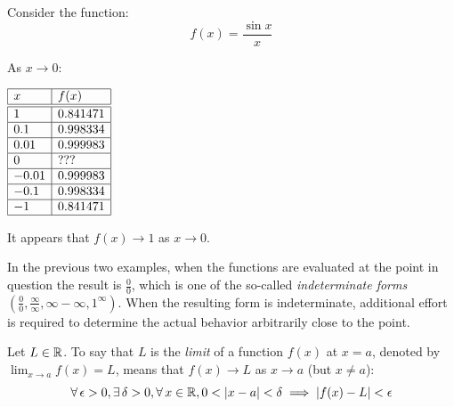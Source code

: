 \documentclass[letterpaper,12pt,fleqn]{article}
\newcommand{\e}{\epsilon}
\renewcommand{\d}{\delta}
\begin{document}
\begin{example}
  Consider the function:
  \[f(x)=\frac{\sin x}{x}\]

  \bigskip

  \begin{center}
  \end{center}

  As \(x\to0\):

  \begin{center}
    \(\begin{array}{|l|l|}
    \hline
    x & f(x) \\
    \hline
    \hline
    1 & 0.841471 \\
    \hline
    0.1 & 0.998334 \\
    \hline
    0.01 & 0.999983 \\
    \hline
    0 & ??? \\
    \hline
    -0.01 & 0.999983 \\
    \hline
    -0.1 & 0.998334 \\
    \hline
    -1 & 0.841471 \\
    \hline
    \end{array}\)
  \end{center}

  \bigskip

  It appears that \(f(x)\to1\) as \(x\to0\).
\end{example}

In the previous two examples, when the functions are evaluated at the point in question the result is
\(\frac{0}{0}\), which is one of the so-called \emph{indeterminate forms} \((\frac{0}{0},\frac{\infty}{\infty},
\infty-\infty,1^{\infty})\).  When the resulting form is indeterminate, additional effort is required to determine
the actual behavior arbitrarily close to the point.

\begin{definition}
  Let \(L\in\mathbb{R}\).  To say that \(L\) is the \emph{limit} of a function \(f(x)\) at \(x=a\), denoted by
  \(\displaystyle\lim_{x\to a}f(x)=L\), means that \(f(x)\to L\) as \(x\to a\) (but \(x\ne a\)):
  \[\forall\,\e>0,\exists\,\d>0,\forall\,x\in\R,0<\abs{x-a}<\d\implies\abs{f(x)-L}<\e\]
\end{definition}
\end{document}

